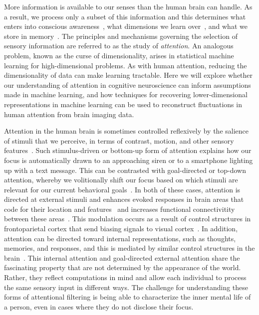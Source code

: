 
\label{sec:aim3}

More information is available to our senses than the human brain can
handle. As a result, we process only a subset of this information and
this determines what enters into conscious
awareness~\citep{Most:2005}, what dimensions we learn
over~\citep{Turk-Browne:2005}, and what we store in
memory~\citep{Aly:2016}. The principles and mechanisms governing the
selection of sensory information are referred to as the study of
\textit{attention}. An analogous problem, known as the curse of
dimensionality, arises in statistical machine learning for
high-dimensional problems. As with human attention, reducing the
dimensionality of data can make learning tractable. Here we will
explore whether our understanding of attention in cognitive
neuroscience can inform assumptions made in machine learning, and how
techniques for recovering lower-dimensional representations in machine
learning can be used to reconstruct fluctuations in human attention
from brain imaging data.

\biobackground{} Attention in the human brain is sometimes controlled
reflexively by the salience of stimuli that we perceive, in terms of
contrast, motion, and other sensory features~\citep{Itti:2000}. Such
stimulus-driven or bottom-up form of attention explains how our focus
is automatically drawn to an approaching siren or to a smartphone
lighting up with a text message. This can be contrasted with
goal-directed or top-down attention, whereby we volitionally shift our
focus based on which stimuli are relevant for our current behavioral
goals~\citep{Yantis:2000}. In both of these cases, attention is
directed at external stimuli and enhances evoked responses in brain
areas that code for their location and features~\citep{Kastner:2000}
and increases functional connectivitity between these
areas~\citep{Turk-Browne:2013}. This modulation occurs as a result of
control structures in frontoparietal cortex that send biasing signals
to visual cortex~\citep{Noudoost:2010}. In addition, attention can be
directed toward internal representations, such as thoughts, memories,
and responses, and this is mediated by similar control structures in
the brain~\citep{Chun:2011}. This internal attention and goal-directed
external attention share the fascinating property that are not
determined by the appearance of the world. Rather, they reflect
computations in mind and allow each individual to process the same
sensory input in different ways. The challenge for understanding these
forms of attentional filtering is being able to characterize the inner
mental life of a person, even in cases where they do not disclose
their focus.

